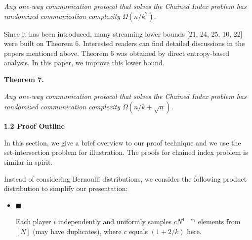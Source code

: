 \documentclass[10pt,a4paper]{article}
\begin{document}
\emph{Any one-way communication protocol that solves the Chained Index problem has randomized communication complexity $\Omega(n/k^{2}).$}\par






Since it has been introduced, many streaming lower bounds [21, 24, 25, 10, 22] were built on Theorem 6. Interested readers can find detailed discussions in the papers mentioned above. Theorem 6 was obtained by direct entropy-based analysis. In this paper, we improve this lower bound.\par





\par\medskip\noindent\textbf{
\textbf{Theorem 7}\textbf{.}
}\par



\emph{Any one-way communication protocol that solves the Chained Index problem has randomized communication complexity $\Omega(n/k+\sqrt{n})$.}\par








\par\medskip\noindent\textbf{
1.2 Proof Outline}\par




In this section, we give a brief overview to our proof technique and we use the set-intersection problem for illustration. The proofs for chained index problem is similar in spirit.\par




Instead of considering Bernoulli distributions, we consider the following product distribution to simplify our presentation:\par


\begin{itemize}


\item[] 
$\blacksquare$ 


Each player $i$ independently and uniformly samples $cN^{1-\alpha_{i}}$ elements from $[N]$ (may have duplicates), where $c$ equals $(1+2/k)$ here.\par





\end{itemize}
\end{document}

